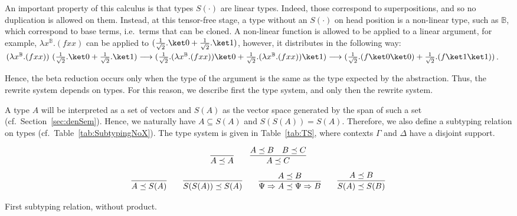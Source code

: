 \documentclass[preprint]{elsarticle}
\newcommand\B{\ensuremath{\mathbb B}}
\newcommand\gB{\ensuremath{\Psi}}
\newcommand\pair[2]{({#1}+{#2})}
\begin{document}
An important property of this calculus is that types $S(\cdot)$ are linear
types. Indeed, those correspond to superpositions, and so no duplication is
allowed on them. Instead, at this tensor-free stage, a type without an
$S(\cdot)$ on head position is a non-linear type, such as $\B$, which correspond
to base terms, i.e.~terms that can be cloned. A non-linear function is allowed
to be applied to a linear argument, for example, $\lambda x^{\B}.(fxx)$ can be
applied to $\pair{\frac 1{\sqrt 2}.\ket 0}{\frac 1{\sqrt 2}.\ket 1}$, however,
it distributes in the following way: $(\lambda x^{\B}.(f xx))~\pair{\frac
  1{\sqrt 2}.\ket 0}{\frac 1{\sqrt 2}.\ket 1} \longrightarrow \pair{\frac
  1{\sqrt 2}.(\lambda x^{\B}.(f xx))\ket 0}{\frac 1{\sqrt 2}.(\lambda x^{\B}.(f
  xx))\ket 1} \longrightarrow \pair{\frac 1{\sqrt 2}.(f\ket 0\ket 0)}{\frac
  1{\sqrt 2}.(f\ket 1\ket 1)} $.

Hence, the beta reduction occurs only when the type of the argument is the same
as the type expected by the abstraction. Thus, the rewrite system depends on
types. For this reason, we describe first the type system, and only then the
rewrite system.

A type $A$ will be interpreted as a set of vectors and $S(A)$ as the vector
space generated by the span of such a set (cf.~Section~\ref{sec:denSem}). Hence,
we naturally have $A\subseteq S(A)$ and $S(S(A))=S(A)$. Therefore, we also
define a subtyping relation on types (cf.~Table~\ref{tab:SubtypingNoX}). The
type system is given in Table~\ref{tab:TS}, where contexts $\Gamma$ and $\Delta$
have a disjoint support.

\begin{table}
  \centering
  \[
    \infer{A \preceq A}{}
    \qquad
    \infer{A \preceq C}{A \preceq B & B \preceq C}
  \]
  \[
    \infer{A\preceq S(A)}{} \qquad \infer{S(S(A))\preceq S(A)}{} \qquad
    \infer{\gB\Rightarrow A\preceq\gB\Rightarrow B}{A\preceq B} \qquad
    \infer{S(A)\preceq S(B)}{A\preceq B}
  \]
  \caption{First subtyping relation, without product.}
  \label{tab:SubtypingNoX}
\end{table}
\end{document}
